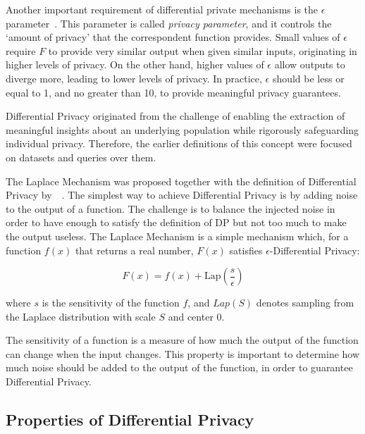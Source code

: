 Another important requirement of differential private mechanisms is the \(\epsilon\) parameter~\cite{DP_Book, DifPrivacyCalNoise, AlgFoundationsDP, DifPrivacy}. This parameter is called \textit{privacy parameter}, and it controls the `amount of privacy' that the correspondent function provides. Small values of \(\epsilon\) require \(F\) to provide very similar output when given similar inputs, originating in higher levels of privacy. On the other hand, higher values of \(\epsilon\) allow outputs to diverge more, leading to lower levels of privacy. In practice, \(\epsilon\) should be less or equal to 1, and no greater than 10, to provide meaningful privacy guarantees. 

Differential Privacy originated from the challenge of enabling the extraction of meaningful insights about an underlying population while rigorously safeguarding individual privacy. Therefore, the earlier definitions of this concept were focused on datasets and queries over them. 


The Laplace Mechanism was proposed together with the definition of Differential Privacy by~\citeauthor{DifPrivacyCalNoise}~\cite{DifPrivacyCalNoise}. The simplest way to achieve Differential Privacy is by adding noise to the output of a function. The challenge is to balance the injected noise in order to have enough to satisfy the definition of DP but not too much to make the output useless. The Laplace Mechanism is a simple mechanism which, for a function \(f(x)\) that returns a real number, \(F(x)\) satisfies \(\epsilon\)-Differential Privacy:

\begin{equation}\label{eq:laplace_mechanism}
    F(x) = f(x) + \text{Lap} (\frac{s}{\epsilon})
\end{equation}

where \(s\) is the sensitivity of the function \(f\), and \(Lap(S)\) denotes sampling from the Laplace distribution with scale \(S\) and center \(0\). 

The sensitivity of a function is a measure of how much the output of the function can change when the input changes. This property is important to determine how much noise should be added to the output of the function, in order to guarantee Differential Privacy. 

\subsection{Properties of Differential Privacy}\label{subsec:properties_differential_privacy}

